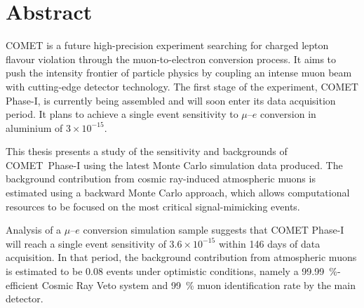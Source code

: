 \chapter*{Abstract}


COMET is a future high-precision experiment searching for charged lepton flavour
violation through the muon-to-electron conversion process. It aims to push the
intensity frontier of particle physics by coupling an intense muon beam with
cutting-edge detector technology. The first stage of the experiment, COMET
Phase-I, is currently being assembled and will soon enter its data acquisition
period. It plans to achieve a single event sensitivity to $\mu$--$e$ conversion
in aluminium of $3 \times 10^{-15}$.

This thesis presents a study of the sensitivity and backgrounds of \mbox{COMET
Phase-I} using the latest Monte Carlo simulation data produced. The background
contribution from cosmic ray-induced atmospheric muons is estimated using a
backward Monte Carlo approach, which allows computational resources to be
focused on the most critical signal-mimicking events.

Analysis of a $\mu$--$e$ conversion simulation sample suggests that COMET
Phase-I will reach a single event sensitivity of $3.6 \times 10^{-15}$ within 146
days of data acquisition. In that period, the background contribution from
atmospheric muons is estimated to be 0.08 events under optimistic conditions,
namely a \SI{99.99}{\percent}-efficient Cosmic Ray Veto system and
\SI{99}{\percent} muon identification rate by the main detector.